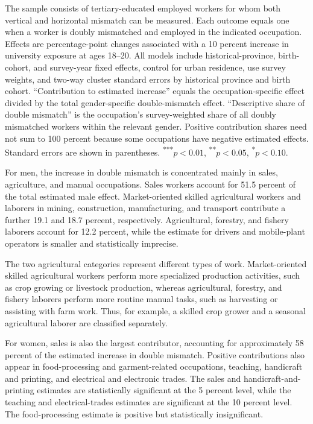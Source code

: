 \begin{table}[htbp]
\begin{threeparttable}
\begin{tablenotes}[flushleft]
    \item The sample consists of tertiary-educated employed workers for whom both vertical and horizontal mismatch can be measured. Each outcome equals one when a worker is doubly mismatched and employed in the indicated occupation. Effects are percentage-point changes associated with a 10 percent increase in university exposure at ages 18--20. All models include historical-province, birth-cohort, and survey-year fixed effects, control for urban residence, use survey weights, and two-way cluster standard errors by historical province and birth cohort. ``Contribution to estimated increase'' equals the occupation-specific effect divided by the total gender-specific double-mismatch effect. ``Descriptive share of double mismatch'' is the occupation's survey-weighted share of all doubly mismatched workers within the relevant gender. Positive contribution shares need not sum to 100 percent because some occupations have negative estimated effects. Standard errors are shown in parentheses. \textsuperscript{***}$p<0.01$, \textsuperscript{**}$p<0.05$, \textsuperscript{*}$p<0.10$.
  \end{tablenotes}
  \end{threeparttable}
\end{table}

For men, the increase in double mismatch is concentrated mainly in sales, agriculture, and manual occupations. Sales workers account for 51.5 percent of the total estimated male effect. Market-oriented skilled agricultural workers and laborers in mining, construction, manufacturing, and transport contribute a further 19.1 and 18.7 percent, respectively. Agricultural, forestry, and fishery laborers account for 12.2 percent, while the estimate for drivers and mobile-plant operators is smaller and statistically imprecise.

The two agricultural categories represent different types of work. Market-oriented skilled agricultural workers perform more specialized production activities, such as crop growing or livestock production, whereas agricultural, forestry, and fishery laborers perform more routine manual tasks, such as harvesting or assisting with farm work. Thus, for example, a skilled crop grower and a seasonal agricultural laborer are classified separately.

For women, sales is also the largest contributor, accounting for approximately 58 percent of the estimated increase in double mismatch. Positive contributions also appear in food-processing and garment-related occupations, teaching, handicraft and printing, and electrical and electronic trades. The sales and handicraft-and-printing estimates are statistically significant at the 5 percent level, while the teaching and electrical-trades estimates are significant at the 10 percent level. The food-processing estimate is positive but statistically insignificant.

